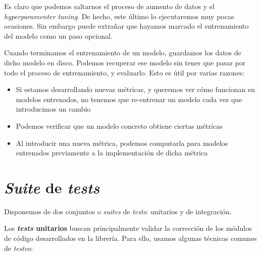 Es claro que podemos saltarnos el proceso de aumento de datos y el \textit{hyperparamenter tuning}. De hecho, este último lo ejecutaremos muy pocas ocasiones. Sin embargo puede extrañar que hayamos marcado el entrenamiento del modelo como un paso opcional.

Cuando terminamos el entrenamiento de un modelo, guardamos los datos de dicho modelo en disco. Podemos recuperar ese modelo sin tener que pasar por todo el proceso de entrenamiento, y evaluarlo. Esto es útil por varias razones:

\begin{itemize}
    \item Si estamos desarrollando nuevas métricas, y queremos ver cómo funcionan en modelos entrenados, no tenemos que re-entrenar un modelo cada vez que introducimos un cambio
    \item Podemos verificar que un modelo concreto obtiene ciertas métricas
    \item Al introducir una nueva métrica, podemos computarla para modelos entrenados previamente a la implementación de dicha métrica
\end{itemize}

\section{\textit{Suite} de \textit{tests}} \label{isec:test_suite}

Disponemos de dos conjuntos o \textit{suites} de \textit{tests}: unitarios y de integración.

Los \textbf{\textit{tests} unitarios} buscan principalmente validar la corrección de los módulos de código desarrollados en la librería. Para ello, usamos algunas técnicas comunes de \textit{testeo}:

